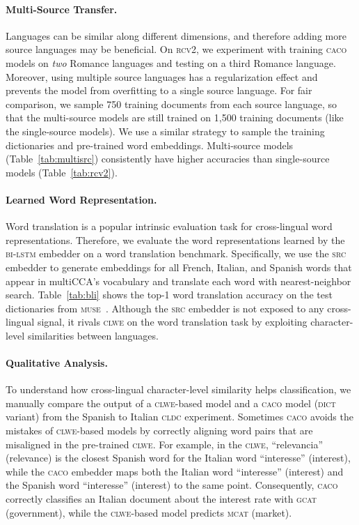 \documentclass[letterpaper]{article} %
\newcommand{\citep}{\cite}
\newcommand{\abr}[1]{\textsc{#1}}
\newcommand{\name}[0]{\textsc{caco}}
\begin{document}
\paragraph{Multi-Source Transfer.}
Languages can be similar along different dimensions, and therefore adding more
source languages may be beneficial.
On \abr{rcv2}, we experiment with training \name{} models on \emph{two} Romance
languages and testing on a third Romance language.
Moreover, using multiple source languages has a regularization
effect and prevents the model from overfitting to a single source language.
For fair comparison, we sample 750 training documents from each source
language, so that the multi-source models are still trained on 1,500 training
documents (like the single-source models).  We use a similar strategy to sample
the training dictionaries and pre-trained word embeddings.  Multi-source models
(Table~\ref{tab:multisrc}) consistently have higher accuracies than single-source models
(Table~\ref{tab:rcv2}).

\paragraph{Learned Word Representation.}
Word translation is a popular intrinsic evaluation task for cross-lingual
word representations.
Therefore, we evaluate the word representations learned by the \abr{bi-lstm}
embedder on a word translation benchmark.
Specifically, we use the \abr{src} embedder to generate embeddings for all
French, Italian, and Spanish words that appear in multiCCA's vocabulary and
translate each word with nearest-neighbor search.
Table~\ref{tab:bli} shows the top-1 word translation accuracy on the test
dictionaries from \abr{muse}~\citep{conneau-18}.
Although the \abr{src} embedder is not exposed to any cross-lingual signal, it
rivals \abr{clwe} on the word translation task by exploiting character-level
similarities between languages.

\paragraph{Qualitative Analysis.}
To understand how cross-lingual character-level similarity helps
classification, we manually compare the output of a \abr{clwe}-based model and
a \name{} model (\abr{dict} variant) from the Spanish to Italian \abr{cldc}
experiment.
Sometimes \name{} avoids the mistakes of \abr{clwe}-based models by correctly
aligning word pairs that are misaligned in the pre-trained \abr{clwe}.
For example, in the \abr{clwe}, ``relevancia'' (relevance) is the closest
Spanish word for the Italian word ``interesse'' (interest), while the
\abr{caco} embedder maps both the Italian word ``interesse'' (interest) and the
Spanish word ``interesse'' (interest) to the same point.  Consequently,
\abr{caco} correctly classifies an Italian document about the interest rate
with \abr{gcat} (government), while the \abr{clwe}-based model predicts
\abr{mcat} (market).
\end{document}
